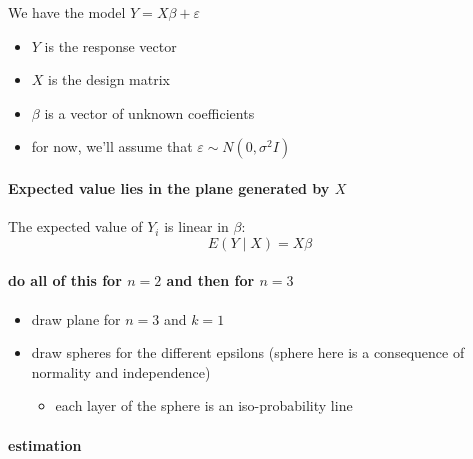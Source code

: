       We have the model $Y = X\beta + \varepsilon$
\begin{itemize}
\item $Y$ is the response vector
\item $X$ is the design matrix
\item $\beta$ is a vector of unknown coefficients
\item for now, we'll assume that $\varepsilon \sim N(0,\sigma^2 I)$
\end{itemize}
\paragraph{Expected value lies in the plane generated by $X$}
\label{sec-1-2-2}

      The expected value of $Y_i$ is linear in $\beta$:
      \[ E(Y \mid X) = X\beta \]
\paragraph{do all of this for $n=2$ and then for $n = 3$}
\label{sec-1-2-2-1}

\begin{itemize}
\item draw plane for $n = 3$ and $k = 1$
\item draw spheres for the different epsilons (sphere here is a
         consequence of normality and independence)
\begin{itemize}
\item each layer of the sphere is an iso-probability line
\end{itemize}
\end{itemize}
\paragraph{estimation}
\label{sec-1-2-3}

